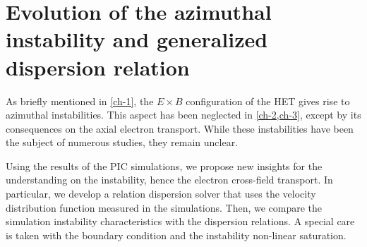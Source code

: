 



\chapter{Evolution of the azimuthal instability and generalized dispersion relation}
\label{ch-5}



\begin{Chabstract}
  
As briefly mentioned in \cref{ch-1}, the $E \times B$ configuration of the \ac{HET} gives rise to azimuthal instabilities.
This aspect has been neglected in \cref{ch-2,ch-3}, except by its consequences on the axial electron transport.
While these instabilities have been the subject of numerous studies, they remain unclear.

Using the results of the \ac{PIC} simulations, we propose new insights for the understanding on the instability, hence the electron cross-field transport.
In particular, we develop a relation dispersion solver that uses the velocity distribution function measured in the simulations.
Then, we compare the simulation instability characteristics with the dispersion relations.
A special care is taken with the boundary condition and the instability non-linear saturation. 
\end{Chabstract}

% 
% 

\minitoc








